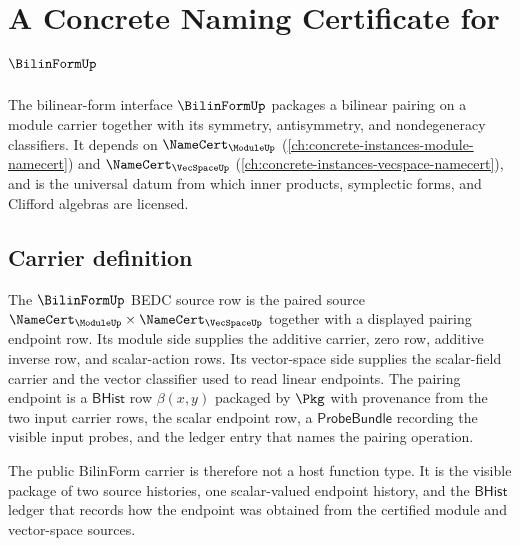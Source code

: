 \chapter{A Concrete Naming Certificate for $\BilinFormUp$}
\label{ch:concrete-instances-bilinform-namecert}

The bilinear-form interface $\BilinFormUp$ packages a bilinear pairing on a module carrier together with its symmetry, antisymmetry, and nondegeneracy classifiers. It depends on $\NameCert_{\ModuleUp}$ (\autoref{ch:concrete-instances-module-namecert}) and $\NameCert_{\VecSpaceUp}$ (\autoref{ch:concrete-instances-vecspace-namecert}), and is the universal datum from which inner products, symplectic forms, and Clifford algebras are licensed.

\section{Carrier definition}
\label{sec:bilinform-carrier}

\begin{definition}
\label{def:bilinform-module-pairing-source-row}
The $\BilinFormUp$ BEDC source row is the paired source
$\NameCert_{\ModuleUp}\times\NameCert_{\VecSpaceUp}$ together with a displayed
pairing endpoint row. Its module side supplies the additive carrier, zero
row, additive inverse row, and scalar-action rows. Its vector-space side
supplies the scalar-field carrier and the vector classifier used to read
linear endpoints. The pairing endpoint is a $\mathsf{BHist}$ row
$\beta(x,y)$ packaged by $\Pkg$ with provenance from the two input carrier
rows, the scalar endpoint row, a $\mathsf{ProbeBundle}$ recording the visible
input probes, and the ledger entry that names the pairing operation.

The public BilinForm carrier is therefore not a host function type. It is the
visible package of two source histories, one scalar-valued endpoint history,
and the $\mathsf{BHist}$ ledger that records how the endpoint was obtained
from the certified module and vector-space sources.
\end{definition}


